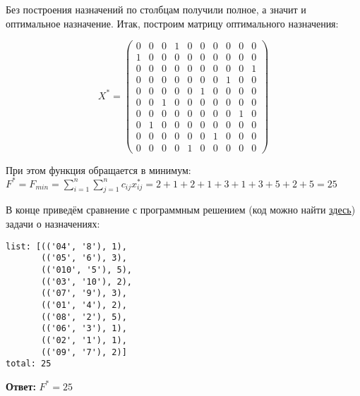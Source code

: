 Без построения назначений по столбцам получили полное, а значит и оптимальное назначение. Итак, построим матрицу оптимального назначения:

\[
    X^* = \begin{pmatrix}
        0 & 0 & 0 & 1 & 0 & 0 & 0 & 0 & 0 & 0 \\
        1 & 0 & 0 & 0 & 0 & 0 & 0 & 0 & 0 & 0 \\
        0 & 0 & 0 & 0 & 0 & 0 & 0 & 0 & 0 & 1 \\
        0 & 0 & 0 & 0 & 0 & 0 & 0 & 1 & 0 & 0 \\
        0 & 0 & 0 & 0 & 0 & 1 & 0 & 0 & 0 & 0 \\
        0 & 0 & 1 & 0 & 0 & 0 & 0 & 0 & 0 & 0 \\
        0 & 0 & 0 & 0 & 0 & 0 & 0 & 0 & 1 & 0 \\
        0 & 1 & 0 & 0 & 0 & 0 & 0 & 0 & 0 & 0 \\
        0 & 0 & 0 & 0 & 0 & 0 & 1 & 0 & 0 & 0 \\
        0 & 0 & 0 & 0 & 1 & 0 & 0 & 0 & 0 & 0
    \end{pmatrix}
\]

При этом функция обращается в минимум: $F^* = F_{min} = \sum\limits_{i=1}^{n} \sum\limits_{j=1}^{n} c_{ij} x^*_{ij} = 2 + 1 + 2 + 1 + 3 + 1 + 3 + 5 + 2 + 5 = 25$

В конце приведём сравнение с программным решением (код можно найти \href{https://github.com/retrobannerS/optimization_methods/blob/main/python/08-lab/hungarian-algorithm.ipynb}{здесь}) задачи о назначениях:


\begin{lstlisting}[language=text]
list: [(('04', '8'), 1),
       (('05', '6'), 3),
       (('010', '5'), 5),
       (('03', '10'), 2),
       (('07', '9'), 3),
       (('01', '4'), 2),
       (('08', '2'), 5),
       (('06', '3'), 1),
       (('02', '1'), 1),
       (('09', '7'), 2)]
total: 25
\end{lstlisting}

\textbf{Ответ:} $F^* = 25$ \label{08-lab-answer}

